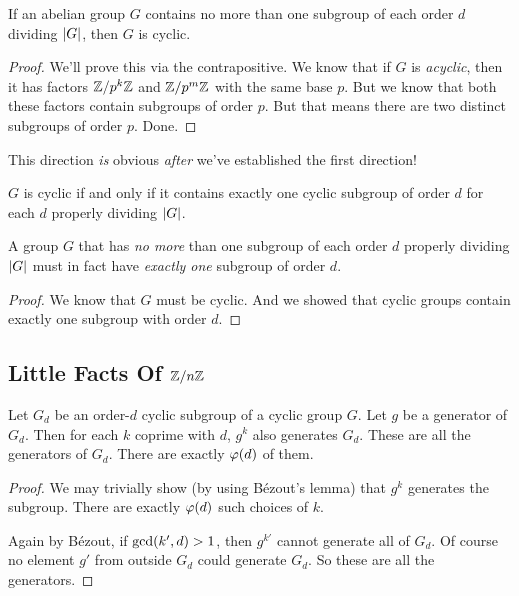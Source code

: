 \begin{proposition}
  If an abelian group $G$ contains no more than one subgroup of each
  order $d$ dividing $|G|$, then $G$ is cyclic.
\end{proposition}

\begin{proof}
  We'll prove this via the contrapositive. We know that if $G$ is
  \emph{acyclic}, then it has factors $\mathbb{Z} / p^k\mathbb{Z}$ and $\mathbb{Z} / p^m\mathbb{Z}$ with
  the same base $p$. But we know that both these factors contain
  subgroups of order $p$. But that means there are two distinct
  subgroups of order $p$. Done.
\end{proof}

\begin{remark}
  This direction \emph{is} obvious \emph{after} we've established the
  first direction!
\end{remark}

\begin{theorem}
  $G$ is cyclic if and only if it contains exactly one cyclic subgroup
  of order $d$ for each $d$ properly dividing $|G|$.
\end{theorem}

\begin{corollary}
  A group $G$ that has \emph{no more} than one subgroup of each order
  $d$ properly dividing $|G|$ must in fact have \emph{exactly one}
  subgroup of order $d$.
\end{corollary}

\begin{proof}
  We know that $G$ must be cyclic. And we showed that cyclic groups
  contain exactly one subgroup with order $d$.
\end{proof}

\subsection{Little Facts Of $\mathbb{Z} / n\mathbb{Z}$}

\begin{proposition}
  Let $G_d$ be an order-$d$ cyclic subgroup of a cyclic group $G$. Let
  $g$ be a generator of $G_d$. Then for each $k$ coprime with $d$, $g^k$
  also generates $G_d$. These are all the generators of $G_d$. There are
  exactly $\varphi\mathopen{}\left( {d} \right)\mathclose{}$ of them.
\end{proposition}

\begin{proof}
  We may trivially show (by using Bézout's lemma) that $g^k$ generates
  the subgroup. There are exactly $\varphi\mathopen{}\left( {d} \right)\mathclose{}$ such choices of $k$.

  Again by Bézout, if $\gcd\mathopen{}\left( {k', d} \right)\mathclose{} > 1$, then $g^{k'}$ cannot generate
  all of $G_d$. Of course no element $g'$ from outside $G_d$ could
  generate $G_d$. So these are all the generators.
\end{proof}

